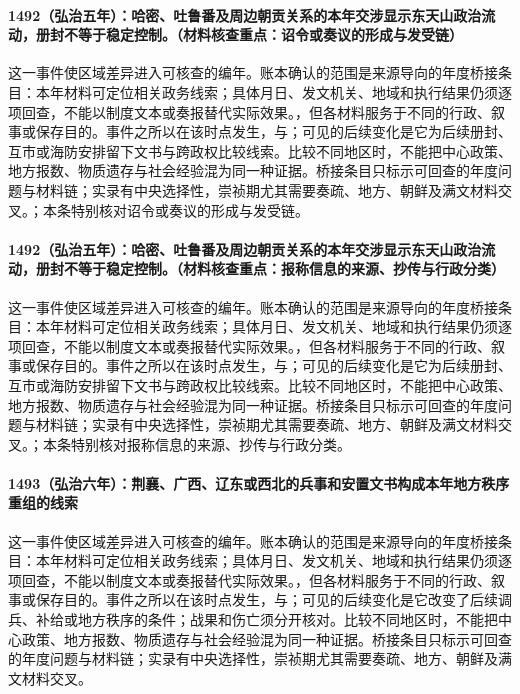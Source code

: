 \paragraph{1492（弘治五年）：哈密、吐鲁番及周边朝贡关系的本年交涉显示东天山政治流动，册封不等于稳定控制。（材料核查重点：诏令或奏议的形成与发受链）} 这一事件使区域差异进入可核查的编年。账本确认的范围是来源导向的年度桥接条目：本年材料可定位相关政务线索；具体月日、发文机关、地域和执行结果仍须逐项回查，不能以制度文本或奏报替代实际效果。，但各材料服务于不同的行政、叙事或保存目的。事件之所以在该时点发生，与；可见的后续变化是它为后续册封、互市或海防安排留下文书与跨政权比较线索。比较不同地区时，不能把中心政策、地方报数、物质遗存与社会经验混为同一种证据。桥接条目只标示可回查的年度问题与材料链；实录有中央选择性，崇祯期尤其需要奏疏、地方、朝鲜及满文材料交叉。；本条特别核对诏令或奏议的形成与发受链。

\paragraph{1492（弘治五年）：哈密、吐鲁番及周边朝贡关系的本年交涉显示东天山政治流动，册封不等于稳定控制。（材料核查重点：报称信息的来源、抄传与行政分类）} 这一事件使区域差异进入可核查的编年。账本确认的范围是来源导向的年度桥接条目：本年材料可定位相关政务线索；具体月日、发文机关、地域和执行结果仍须逐项回查，不能以制度文本或奏报替代实际效果。，但各材料服务于不同的行政、叙事或保存目的。事件之所以在该时点发生，与；可见的后续变化是它为后续册封、互市或海防安排留下文书与跨政权比较线索。比较不同地区时，不能把中心政策、地方报数、物质遗存与社会经验混为同一种证据。桥接条目只标示可回查的年度问题与材料链；实录有中央选择性，崇祯期尤其需要奏疏、地方、朝鲜及满文材料交叉。；本条特别核对报称信息的来源、抄传与行政分类。

\paragraph{1493（弘治六年）：荆襄、广西、辽东或西北的兵事和安置文书构成本年地方秩序重组的线索} 这一事件使区域差异进入可核查的编年。账本确认的范围是来源导向的年度桥接条目：本年材料可定位相关政务线索；具体月日、发文机关、地域和执行结果仍须逐项回查，不能以制度文本或奏报替代实际效果。，但各材料服务于不同的行政、叙事或保存目的。事件之所以在该时点发生，与；可见的后续变化是它改变了后续调兵、补给或地方秩序的条件；战果和伤亡须分开核对。比较不同地区时，不能把中心政策、地方报数、物质遗存与社会经验混为同一种证据。桥接条目只标示可回查的年度问题与材料链；实录有中央选择性，崇祯期尤其需要奏疏、地方、朝鲜及满文材料交叉。

